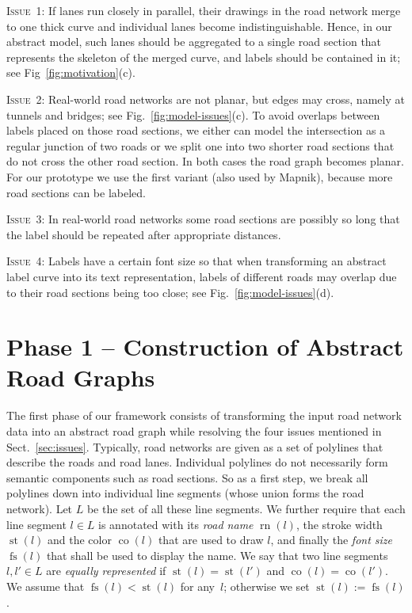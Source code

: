 \documentclass[a4paper,11pt]{article}
\DeclareMathOperator{\lFont}{fs}
\DeclareMathOperator{\lName}{rn}
\DeclareMathOperator{\lStroke}{st}
\DeclareMathOperator{\lColor}{co}
\newcommand{\ILong}{\textsc{Issue~3}\xspace}
\newcommand{\ILanes}{\textsc{Issue~1}\xspace}
\newcommand{\ICrossings}{\textsc{Issue~2}\xspace}
\newcommand{\IFatLabels}{\textsc{Issue~4}\xspace}
\begin{document}
\ILanes: If lanes run closely in parallel, their drawings in the road
network merge to one thick curve and individual lanes become
indistinguishable. Hence, in our abstract model, such lanes should be aggregated to a single road
section that represents the skeleton of the merged curve, 
and labels should be contained in it; see Fig~\ref{fig:motivation}(c).

\ICrossings: Real-world road networks are not planar, but edges may cross,
namely at tunnels and bridges; see Fig.~\ref{fig:model-issues}(c).
To avoid
overlaps between labels placed on those road sections, we either can model
the intersection as a regular junction of two roads or
we split one into two shorter road sections that do not cross the other road section. In both
cases the road graph becomes planar. For our
prototype we use the first variant (also used by Mapnik), 
because more road sections can be labeled.

\ILong: In real-world road networks some road sections are possibly so long
that the label should be repeated after appropriate distances.

\IFatLabels: Labels have a certain
font size so that when transforming an abstract label curve
into its text representation, labels of different roads may overlap due to their road sections being too close; see Fig.~\ref{fig:model-issues}(d).






\section{Phase 1 -- Construction of Abstract Road Graphs}\label{sec:transformation}

The first phase of our framework consists of transforming the input road network data into an abstract road graph while resolving the four issues mentioned in Sect.~\ref{sec:issues}.
Typically, road networks are
given as a set of polylines that describe the 
roads and road lanes. Individual polylines do not necessarily form semantic components such as road sections.
So as a first step, we break all polylines down into individual line segments (whose union forms the road network).
Let $L$ be the set of all these line segments.
We further require that each line segment $l\in L$
is annotated with its \emph{road name} $\lName(l)$, the stroke width
$\lStroke(l)$ and the color $\lColor(l)$ that are used to draw $l$,
and finally the \emph{font size} $\lFont(l)$ that shall be used to
display the name. We say that two line
segments $l,l'\in L$ are \emph{equally represented} if
$\lStroke(l)=\lStroke(l')$ and $\lColor(l)=\lColor(l')$. We assume
that $\lFont(l) < \lStroke(l)$ for any~$l$; otherwise we set
$\lStroke(l):=\lFont(l)$.
\end{document}
